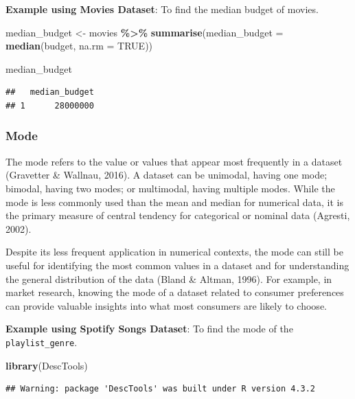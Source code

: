 \documentclass[
  b5paper]{book}
\newenvironment{Shaded}{\begin{snugshade}}{\end{snugshade}}
\newcommand{\AttributeTok}[1]{\textcolor[rgb]{0.13,0.29,0.53}{#1}}
\newcommand{\ConstantTok}[1]{\textcolor[rgb]{0.56,0.35,0.01}{#1}}
\newcommand{\FunctionTok}[1]{\textcolor[rgb]{0.13,0.29,0.53}{\textbf{#1}}}
\newcommand{\NormalTok}[1]{#1}
\newcommand{\OtherTok}[1]{\textcolor[rgb]{0.56,0.35,0.01}{#1}}
\newcommand{\SpecialCharTok}[1]{\textcolor[rgb]{0.81,0.36,0.00}{\textbf{#1}}}
\begin{document}
\textbf{Example using Movies Dataset}: To find the median budget of movies.

\begin{Shaded}
\begin{Highlighting}[]
\NormalTok{median\_budget }\OtherTok{\textless{}{-}}\NormalTok{ movies }\SpecialCharTok{\%\textgreater{}\%} 
  \FunctionTok{summarise}\NormalTok{(}\AttributeTok{median\_budget =} \FunctionTok{median}\NormalTok{(budget, }\AttributeTok{na.rm =} \ConstantTok{TRUE}\NormalTok{))}

\NormalTok{median\_budget}
\end{Highlighting}
\end{Shaded}

\begin{verbatim}
##   median_budget
## 1      28000000
\end{verbatim}

\hypertarget{mode}{%
\subsubsection*{Mode}\label{mode}}

The mode refers to the value or values that appear most frequently in a dataset (Gravetter \& Wallnau, 2016). A dataset can be unimodal, having one mode; bimodal, having two modes; or multimodal, having multiple modes. While the mode is less commonly used than the mean and median for numerical data, it is the primary measure of central tendency for categorical or nominal data (Agresti, 2002).

Despite its less frequent application in numerical contexts, the mode can still be useful for identifying the most common values in a dataset and for understanding the general distribution of the data (Bland \& Altman, 1996). For example, in market research, knowing the mode of a dataset related to consumer preferences can provide valuable insights into what most consumers are likely to choose.

\textbf{Example using Spotify Songs Dataset}: To find the mode of the \texttt{playlist\_genre}.

\begin{Shaded}
\begin{Highlighting}[]
\FunctionTok{library}\NormalTok{(DescTools)}
\end{Highlighting}
\end{Shaded}

\begin{verbatim}
## Warning: package 'DescTools' was built under R version 4.3.2
\end{verbatim}
\end{document}
